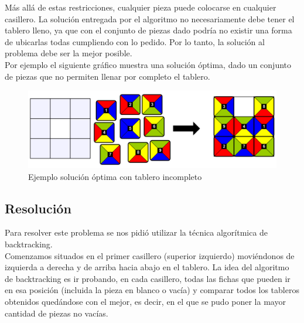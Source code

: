 M\'as all\'a de estas restricciones, cualquier pieza puede colocarse en cualquier casillero. La soluci\'on entregada por el algoritmo no necesariamente debe tener el tablero lleno, ya que con el conjunto de piezas dado podr\'ia no existir una forma de ubicarlas todas cumpliendo con lo pedido. Por lo tanto, la soluci\'on al problema debe ser la mejor posible.\\

Por ejemplo el siguiente gr\'afico muestra una soluci\'on \'optima, dado un conjunto de piezas que no permiten llenar por completo el tablero.\\

\begin{figure}[h]
\begin{center}
\includegraphics[scale=0.4]{./img/tableroIncompleto.png}
\caption{Ejemplo soluci\'on \'optima con tablero incompleto}
\end{center}
\end{figure}

\subsection{Resoluci\'on}

Para resolver este problema se nos pidi\'o utilizar la t\'ecnica algor\'itmica de backtracking.\\ 
Comenzamos situados en el primer casillero (superior izquierdo) movi\'endonos de izquierda a derecha y de arriba hacia abajo en el tablero. La idea del algoritmo de backtracking es ir probando, en cada casillero, todas las fichas que pueden ir en esa posici\'on (incluida la pieza en blanco o vac\'ia) y comparar todos los tableros obtenidos qued\'andose con el mejor, es decir, en el que se pudo poner la mayor cantidad de piezas no vac\'ias. \\

